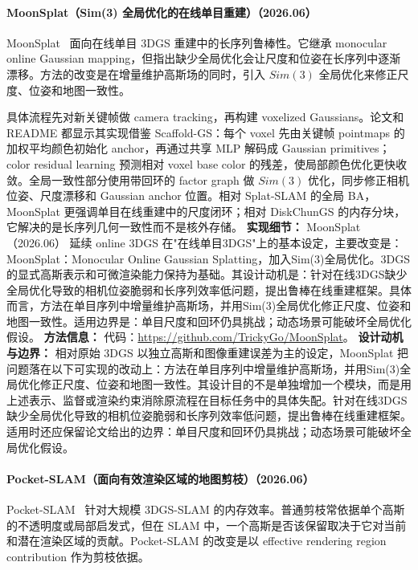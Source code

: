 \paragraph{MoonSplat（Sim(3) 全局优化的在线单目重建）（2026.06）}
MoonSplat~\cite{2606_17935} 面向在线单目 3DGS 重建中的长序列鲁棒性。它继承 monocular online Gaussian mapping，但指出缺少全局优化会让尺度和位姿在长序列中逐渐漂移。方法的改变是在增量维护高斯场的同时，引入 $Sim(3)$ 全局优化来修正尺度、位姿和地图一致性。

具体流程先对新关键帧做 camera tracking，再构建 voxelized Gaussians。论文和 README 都显示其实现借鉴 Scaffold-GS：每个 voxel 先由关键帧 pointmaps 的加权平均颜色初始化 anchor，再通过共享 MLP 解码成 Gaussian primitives；color residual learning 预测相对 voxel base color 的残差，使局部颜色优化更快收敛。全局一致性部分使用带回环的 factor graph 做 $Sim(3)$ 优化，同步修正相机位姿、尺度漂移和 Gaussian anchor 位置。相对 Splat-SLAM 的全局 BA，MoonSplat 更强调单目在线重建中的尺度闭环；相对 DiskChunGS 的内存分块，它解决的是长序列几何一致性而不是核外存储。
\textbf{实现细节：} MoonSplat（2026.06） 延续 online 3DGS 在"在线单目3DGS"上的基本设定，主要改变是：MoonSplat：Monocular Online Gaussian Splatting，加入Sim(3)全局优化。3DGS 的显式高斯表示和可微渲染能力保持为基础。其设计动机是：针对在线3DGS缺少全局优化导致的相机位姿脆弱和长序列效率低问题，提出鲁棒在线重建框架。具体而言，方法在单目序列中增量维护高斯场，并用Sim(3)全局优化修正尺度、位姿和地图一致性。适用边界是：单目尺度和回环仍具挑战；动态场景可能破坏全局优化假设。
\textbf{方法信息：} 代码：\url{https://github.com/TrickyGo/MoonSplat}。
\textbf{设计动机与边界：} 相对原始 3DGS 以独立高斯和图像重建误差为主的设定，MoonSplat 把问题落在以下可实现的改动上：方法在单目序列中增量维护高斯场，并用Sim(3)全局优化修正尺度、位姿和地图一致性。其设计目的不是单独增加一个模块，而是用上述表示、监督或渲染约束消除原流程在目标任务中的具体失配。针对在线3DGS缺少全局优化导致的相机位姿脆弱和长序列效率低问题，提出鲁棒在线重建框架。适用时还应保留论文给出的边界：单目尺度和回环仍具挑战；动态场景可能破坏全局优化假设。
\paragraph{Pocket-SLAM（面向有效渲染区域的地图剪枝）（2026.06）}
Pocket-SLAM~\cite{2606_24796} 针对大规模 3DGS-SLAM 的内存效率。普通剪枝常依据单个高斯的不透明度或局部启发式，但在 SLAM 中，一个高斯是否该保留取决于它对当前和潜在渲染区域的贡献。Pocket-SLAM 的改变是以 effective rendering region contribution 作为剪枝依据。

